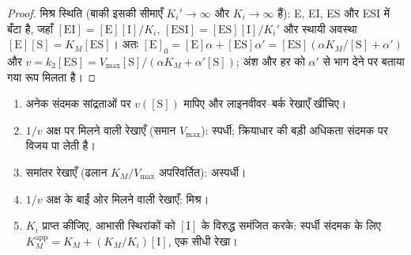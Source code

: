 \begin{proof}
मिश्र स्थिति (बाकी इसकी सीमाएँ $K_i' \to \infty$ और $K_i \to \infty$ हैं): 
E, EI, ES और ESI में बँटा है, जहाँ $[\mathrm{EI}] = [\mathrm E][\mathrm I]/K_i$, $[\mathrm{ESI}] = [\mathrm{ES}][\mathrm I]/K_i'$
और स्थायी अवस्था $[\mathrm E][\mathrm S] = K_M[\mathrm{ES}]$। अतः $[\mathrm E]_0 = [\mathrm E]\alpha + [\mathrm{ES}]\alpha' =
[\mathrm{ES}](\alpha K_M/[\mathrm S] + \alpha')$ और $v = k_2[\mathrm{ES}] = V_{\max}[\mathrm S]/(\alpha K_M + \alpha'[\mathrm S])$; अंश
और हर को $\alpha'$ से भाग देने पर बताया गया रूप मिलता है।
\end{proof}

\begin{method}\label{met:b3:complex-kinetics:inhibition-type}
\begin{enumerate}
  \item अनेक संदमक सांद्रताओं पर $v([\mathrm S])$ मापिए और
        लाइनवीवर--बर्क रेखाएँ खींचिए।
  \item $1/v$ अक्ष पर मिलने वाली रेखाएँ (समान $V_{\max}$): स्पर्धी; क्रियाधार की बड़ी अधिकता
        संदमक पर विजय पा लेती है।
  \item समांतर रेखाएँ (ढलान $K_M/V_{\max}$ अपरिवर्तित): अस्पर्धी।
  \item $1/v$ अक्ष के बाईं ओर मिलने वाली रेखाएँ: मिश्र।
  \item $K_i$ प्राप्त कीजिए, आभासी स्थिरांकों को $[\mathrm I]$ के विरुद्ध समंजित करके:
        स्पर्धी संदमक के लिए $K_M^{\mathrm{app}} = K_M + (K_M/K_i)[\mathrm I]$, एक सीधी रेखा।
\end{enumerate}
\end{method}

